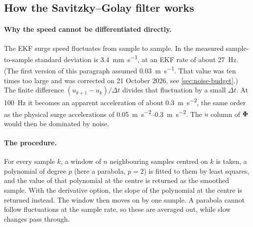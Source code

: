 \subsection{How the Savitzky--Golay filter works}
\label{sec:sg-mechanics}

\begin{revised}[title=Added 16 October 2026,breakable]
\paragraph{Why the speed cannot be differentiated directly.} The EKF surge speed fluctuates from
sample to sample. In  the measured sample-to-sample standard deviation
is \qty{3.4}{\milli\metre\per\second}, at an EKF rate of about \qty{27}{\hertz}. (The first version
of this paragraph assumed \qty{0.03}{\metre\per\second}. That value was ten times too large and
was corrected on 21 October 2026, see \cref{sec:noise-budget}.) The finite difference
$(u_{k+1}-u_k)/\Delta t$ divides that fluctuation by a small $\Delta t$. At \qty{100}{\hertz}
it becomes an apparent acceleration of about \qty{0.3}{\metre\per\second\squared}, the same order
as the physical surge accelerations of \qtyrange{0.05}{0.3}{\metre\per\second\squared}. The
$\dot u$ column of $\boldsymbol{\Phi}$ would then be dominated by noise.

\paragraph{The procedure.} For every sample $k$, a window of $n$ neighbouring samples centred on
$k$ is taken, a polynomial of degree $p$ (here a parabola, $p = 2$) is fitted to them by least
squares, and the value of that polynomial at the centre is returned as the smoothed sample.
With the derivative option, the slope of the polynomial at the centre is returned instead. The
window then moves on by one sample. A parabola cannot follow fluctuations at the sample rate,
so these are averaged out, while slow changes pass through.


\end{revised}
